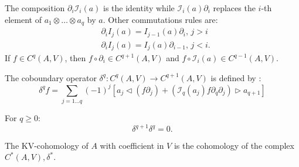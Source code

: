 The composition $\partial_i \mathcal{I}_i(a)$ is the identity while $\mathcal{I}_i(a) \partial_i$ replaces the $i$-th element of $a_1 \otimes \dots \otimes a_q$ by $a.$
Other commutations rules are:
\begin{equation}
    \label{eq:commutation_face_insertion}
    \begin{split}
    & \partial_i I_j(a) = I_{j-1}(a) \partial_i, \, j > i \\
    & \partial_i I_j(a) = I_j(a) \partial_{i-1}, \, j < i.
    \end{split}
\end{equation}
If $f \in C^q(A,V)$, then $f \circ \partial_i \in C^{q+1}(A,V)$ and $f \circ \mathcal{I}_i(a) \in C^{q-1}(A,V).$ 
\begin{defn}
    \label{def:kv_coboundary}
    The coboundary operator $\delta^q \colon C^q \left( A,V \right) \to C^{q+1}\left( A,V \right)$ is defined by \cite{Boyom2002}:
    \begin{equation}
        \label{eq:coboundary}
        \delta^q f = \sum_{j=1 \dots q} \left( -1 \right)^j \left[ a_j  \triangleleft \left(f \partial_j\right) + \left(\mathcal{I}_q(a_j) f \partial_{q}\partial_j\right)\triangleright a_{q+1}  \right]
    \end{equation}
\end{defn}
\begin{prop}
    \label{prop:delta_square}
    For $q \geq 0:$
    \begin{equation}
    \label{eq:delta_square}
    \delta^{q+1} \delta^q = 0.
    \end{equation}
\end{prop}
\begin{defn}
\label{def:kv_cohomology}
The KV-cohomology of $A$ with coefficient in $V$ is the cohomology of the complex $C^*\left( A,V \right), \delta^*.$
\end{defn}
